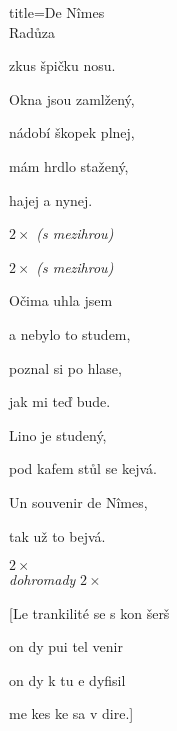 \begin{song}{title=\predtitle\centering De N\^{i}mes \\\large Radůza  \vspace*{-0.3cm}}
\begin{centerjustified}
\begin{varwidth}[t]{0.48\textwidth}
	zkus špičku nosu.

	Okna jsou zamlžený,

	nádobí škopek plnej,

	mám hrdlo stažený,
	
	hajej a nynej.

 $2\times$ \textit{(s mezihrou)}

 $2\times$ \textit{(s mezihrou)}

\sloka
	Očima uhla jsem
	
	a nebylo to studem,
	
	poznal si po hlase,

	jak mi teď bude.
	
	Lino je studený,

	pod kafem stůl se kejvá.
	
	Un souvenir de N\^{i}mes,
	
	tak už to bejvá.

 $2\times$\\ \hspace*{1.1cm} \textit{dohromady}
 $2\times$


\end{varwidth}
\end{centerjustified}

\vspace*{1.5cm}
\begin{centerjustified}
\begin{varwidth}[t]{0.48\textwidth}\setlength{\parindent}{0.45cm}  %

\end{varwidth}\begin{varwidth}[t]{0.48\textwidth}\setlength{\parindent}{0.45cm}%
\ssloka{}
[Le trankilité se s kon šerš

  on dy pui tel venir

  on dy k tu e dyfisil

  me kes ke sa v dire.]
\end{varwidth}

\end{centerjustified}
\setcounter{Slokočet}{0}
\end{song}

